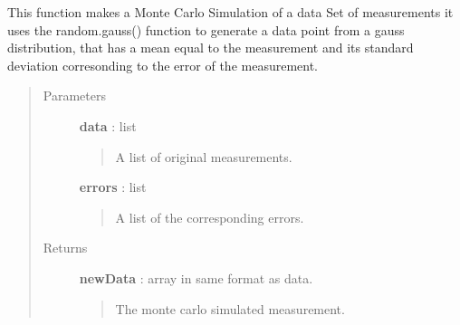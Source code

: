 \documentclass[a4paper,10pt,english]{sphinxmanual}
\begin{document}

\begin{fulllineitems}
\label{functions:astrolyze.functions.astro_functions.generate_monte_carlo_data_line}
This function makes a Monte Carlo Simulation of a data Set of measurements
it uses the random.gauss() function to generate a data point
from a gauss distribution, that has a mean equal to the measurement
and its standard deviation corresonding to the error of the measurement.
\begin{quote}\begin{description}
\item[{Parameters }] \leavevmode
\textbf{data} : list
\begin{quote}

A list of original measurements.
\end{quote}

\textbf{errors} : list
\begin{quote}

A list of the corresponding errors.
\end{quote}

\item[{Returns }] \leavevmode
\textbf{newData} : array in same format as data.
\begin{quote}

The monte carlo simulated measurement.
\end{quote}

\end{description}\end{quote}







\end{fulllineitems}

\end{document}
